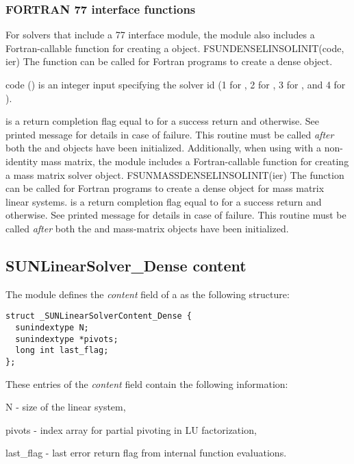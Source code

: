 \subsubsection*{FORTRAN 77 interface functions}
For solvers that include a {\F} 77 interface module, the {\sunlinsoldense}
module also includes a Fortran-callable function for creating a
 object.
%
%
{
  FSUNDENSELINSOLINIT(code, ier)
}
{
  The function  can be called for Fortran programs
  to create a dense  object.
}
{
  \begin{args}[code]
  \item[code] ()
    is an integer input specifying the solver id (1 for {\cvode}, 2
    for {\ida}, 3 for {\kinsol}, and 4 for {\arkode}).
  \end{args}
}
{
   is a return completion flag equal to  for a success
  return and  otherwise. See printed message for details in case
  of failure.
}
{
  This routine must be
  called \emph{after} both the {\nvector} and {\sunmatrix} objects have
  been initialized.
}
Additionally, when using {\arkode} with a non-identity
mass matrix, the {\sunlinsoldense} module includes a Fortran-callable
function for creating a  mass matrix solver
object.
%
%
{
  FSUNMASSDENSELINSOLINIT(ier)
}
{
  The function  can be called for Fortran programs
  to create a dense  object for mass matrix linear
  systems.
}
{}
{
   is a  return completion flag equal to  for a success
  return and  otherwise. See printed message for details in case
  of failure.
}
{
  This routine must be
  called \emph{after} both the {\nvector} and {\sunmatrix} mass-matrix
  objects have been initialized.
}


\subsection{SUNLinearSolver\_Dense content}
\label{ss:sunlinsol_dense_content}

The {\sunlinsoldense} module defines the \textit{content} field of a
 as the following structure:
\begin{verbatim} 
struct _SUNLinearSolverContent_Dense {
  sunindextype N;
  sunindextype *pivots;
  long int last_flag;
};
\end{verbatim}
These entries of the \emph{content} field contain the following
information:
\begin{args}
  \item[N] - size of the linear system,
  \item[pivots] - index array for partial pivoting in LU factorization,
  \item[last\_flag] - last error return flag from internal function evaluations.
\end{args}

